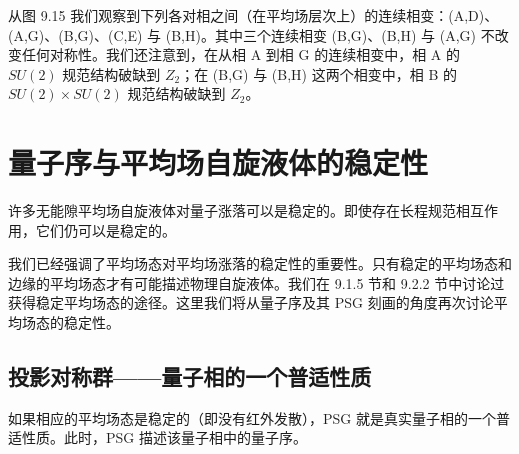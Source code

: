 从图 9.15 我们观察到下列各对相之间（在平均场层次上）的连续相变：(A,D)、(A,G)、(B,G)、(C,E) 与 (B,H)。其中三个连续相变 (B,G)、(B,H) 与 (A,G) 不改变任何对称性。我们还注意到，在从相 A 到相 G 的连续相变中，相 A 的 $SU(2)$ 规范结构破缺到 $Z_2$；在 (B,G) 与 (B,H) 这两个相变中，相 B 的 $SU(2)\times SU(2)$ 规范结构破缺到 $Z_2$。

\section{量子序与平均场自旋液体的稳定性}

\begin{keypoints}
\item 许多无能隙平均场自旋液体对量子涨落可以是稳定的。即使存在长程规范相互作用，它们仍可以是稳定的。
\end{keypoints}

我们已经强调了平均场态对平均场涨落的稳定性的重要性。只有稳定的平均场态和边缘的平均场态才有可能描述物理自旋液体。我们在 9.1.5 节和 9.2.2 节中讨论过获得稳定平均场态的途径。这里我们将从量子序及其 PSG 刻画的角度再次讨论平均场态的稳定性。


\subsection{投影对称群——量子相的一个普适性质}

\begin{keypoints}
\item 如果相应的平均场态是稳定的（即没有红外发散），PSG 就是真实量子相的一个普适性质。此时，PSG 描述该量子相中的量子序。
\end{keypoints}

